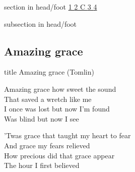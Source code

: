 \documentclass[aspectratio=169]{beamer}
\begin{document}
{
{ 
 {
 \begin{beamercolorbox}[ht=4.5ex,dp=1.5ex,%
      leftskip=.3cm,rightskip=.3cm plus1fil]{section in head/foot}
 \fontsize{12}{25}\selectfont 
\hyperlink{Amazing grace['My chains are gone'](Tomlin)1}{1  }\hyperlink{Amazing grace['My chains are gone'](Tomlin)2}{2  }\hyperlink{Amazing grace['My chains are gone'](Tomlin)C}{C  }\hyperlink{Amazing grace['My chains are gone'](Tomlin)3}{3  }\hyperlink{Amazing grace['My chains are gone'](Tomlin)4}{4  } 
 \end{beamercolorbox}%
  \begin{beamercolorbox}[ht=2.5ex,dp=1.125ex,%
   leftskip=.3cm,rightskip=.3cm plus1fil]{subsection in head/foot}
   \insertauthor
 \end{beamercolorbox}%
 }
}
\subsection{Amazing grace}
\hypertarget{Amazing grace['My chains are gone'](Tomlin)}{}
\begin{frame}{}
 \vfill
  \centering
  \begin{beamercolorbox}[sep=8pt,center,shadow=true,rounded=true]{title}
    Amazing grace (Tomlin)    
  \end{beamercolorbox}
  \vfill
\end{frame}

\hypertarget{Amazing grace['My chains are gone'](Tomlin)1}{}
\begin{frame}{}
\fontsize{22.5}{27.0}\selectfont

Amazing grace how sweet the sound\\ 
That saved a wretch like me\\ 
I once was lost but now I'm found\\ 
Was blind but now I see

\end{frame}
\hypertarget{Amazing grace['My chains are gone'](Tomlin)2}{}
\begin{frame}{}
\fontsize{22.5}{27.0}\selectfont

'Twas grace that taught my heart to fear\\ 
And grace my fears relieved\\ 
How precious did that grace appear\\ 
The hour I first believed


\end{frame}}
\end{document}
